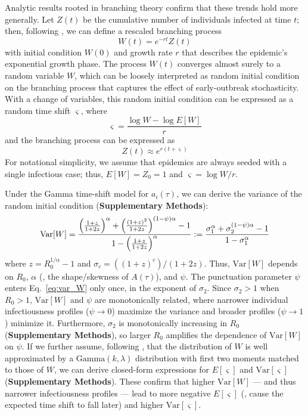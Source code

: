 Analytic results rooted in branching theory confirm that these trends hold more generally. Let $Z(t)$ be the cumulative number of individuals infected at time $t$; then, following \citet{morris_computation_2024}, we can define a rescaled branching process 
\begin{equation}
	W(t) = e^{-r t} Z(t)
\end{equation}
with initial condition $W(0)$ and growth rate $r$ that describes the epidemic's exponential growth phase. The process $W(t)$ converges almost surely to a random variable $W$, which can be loosely interpreted as random initial condition on the branching process that captures the effect of early-outbreak stochasticity. With a change of variables, this random initial condition can be expressed as a random time shift $\varsigma$, where 
\begin{equation}
	\varsigma = \frac{\log W - \log E[W]}{r}
\end{equation}
and the branching process can be expressed as 
\begin{equation}
	Z(t) \approx e^{r(t + \varsigma)}
\end{equation}
For notational simplicity, we assume that epidemics are always seeded with a single infectious case; thus, $E[W] = Z_0 = 1$ and $\varsigma = \log W / r$. 

Under the Gamma time-shift model for $a_i(\tau)$, we can derive the variance of the random initial condition ({\bf Supplementary Methods}): 
\begin{equation}
	\text{Var}[W] = \frac{
		\Bigl(\frac{1 + z}{1 + 2z}\Bigr)^\alpha + \Bigl(\frac{(1 + z)^2}{1 + 2z}\Bigr)^{(1-\psi) \alpha} - 1
	}{
		1 - \Bigl(\frac{1 + z}{1 + 2z}\Bigr)^\alpha
	} := 
	\frac{\sigma_1^\alpha + \sigma_2^{(1-\psi)\alpha} - 1}{1 - \sigma_1^\alpha}
	\label{eq:var_W}
\end{equation}
where $z = R_0^{1/\alpha} - 1$ and $\sigma_c = ((1+z)^c) / (1 + 2z)$. Thus, $\text{Var}[W]$ depends on $R_0$, $\alpha$ (\ie, the shape/skewness of $A(\tau)$), and $\psi$. The punctuation parameter $\psi$ enters Eq.~\ref{eq:var_W} only once, in the exponent of $\sigma_2$. Since $\sigma_2 > 1$ when $R_0 > 1$, $\text{Var}[W]$ and $\psi$ are monotonically related, where narrower individual infectiousness profiles ($\psi \rightarrow 0$) maximize the variance and broader profiles ($\psi \rightarrow 1$) minimize it. Furthermore, $\sigma_2$ is monotonically increasing in $R_0$ ({\bf Supplementary Methods}), so larger $R_0$ amplifies the dependence of $\text{Var}[W]$ on $\psi$. If we further assume, following \citet{morris_computation_2024}, that the distribution of $W$ is well approximated by a $\text{Gamma}(k, \lambda)$ distribution with first two moments matched to those of $W$, we can derive closed-form expressions for $E[\varsigma]$ and $\text{Var}[\varsigma]$ ({\bf Supplementary Methods}). These confirm that higher $\text{Var}[W]$ --- and thus narrower infectiousness profiles --- lead to more negative $E[\varsigma]$ (\ie, cause the expected time shift to fall later) and higher $\text{Var}[\varsigma]$. 

